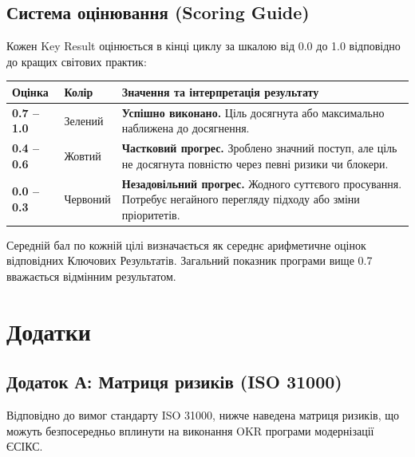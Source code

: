 \documentclass{article}
\begin{document}
\subsection{Система оцінювання (Scoring Guide)}
Кожен Key Result оцінюється в кінці циклу за шкалою від 0.0 до 1.0 відповідно до кращих світових практик:
\begin{longtable}{@{}p{2.0cm}p{2.0cm}p{9.5cm}@{}}
\toprule
\textbf{Оцінка} & \textbf{Колір} & \textbf{Значення та інтерпретація результату} \\
\midrule
\textbf{0.7 -- 1.0} & Зелений & \textbf{Успішно виконано.} Ціль досягнута або максимально наближена до досягнення. \\
\midrule
\textbf{0.4 -- 0.6} & Жовтий & \textbf{Частковий прогрес.} Зроблено значний поступ, але ціль не досягнута повністю через певні ризики чи блокери. \\
\midrule
\textbf{0.0 -- 0.3} & Червоний & \textbf{Незадовільний прогрес.} Жодного суттєвого просування. Потребує негайного перегляду підходу або зміни пріоритетів. \\
\bottomrule
\end{longtable}

Середній бал по кожній цілі визначається як середнє арифметичне оцінок відповідних Ключових Результатів. Загальний показник програми вище 0.7 вважається відмінним результатом.

\newpage

\section{Додатки}

\subsection{Додаток А: Матриця ризиків (ISO 31000)}
Відповідно до вимог стандарту ISO 31000, нижче наведена матриця ризиків, що можуть безпосередньо вплинути на виконання OKR програми модернізації ЄСІКС.
\end{document}
